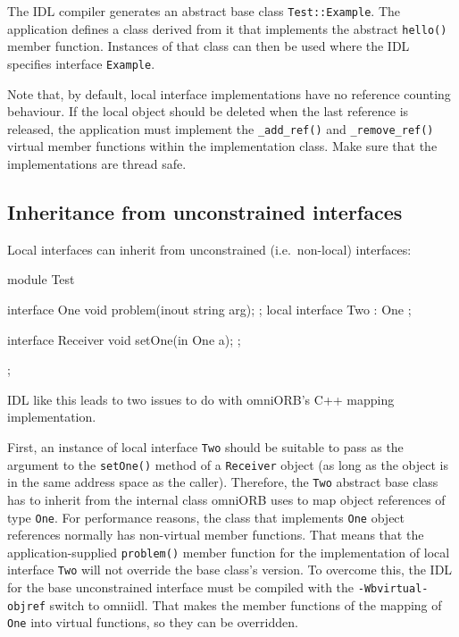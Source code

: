 \documentclass[11pt,oneside,a4paper]{book}
\newcommand{\type}[1]{\texttt{#1}}
\newcommand{\op}[1]{\texttt{#1()}}
\newcommand{\cmdline}[1]{\texttt{#1}}
\begin{document}
The IDL compiler generates an abstract base class
\type{Test::Example}. The application defines a class derived from it
that implements the abstract \op{hello} member function. Instances of
that class can then be used where the IDL specifies interface
\type{Example}.

Note that, by default, local interface implementations have no
reference counting behaviour. If the local object should be deleted
when the last reference is released, the application must implement
the \op{\_add\_ref} and \op{\_remove\_ref} virtual member functions
within the implementation class. Make sure that the implementations
are thread safe.


\subsection{Inheritance from unconstrained interfaces}

Local interfaces can inherit from unconstrained (i.e.\ non-local)
interfaces:

\begin{idllisting}
module Test {
  interface One {
    void problem(inout string arg);
  };
  local interface Two : One {
  };

  interface Receiver {
    void setOne(in One a);
  };
};
\end{idllisting}

IDL like this leads to two issues to do with omniORB's C++ mapping
implementation.

First, an instance of local interface \type{Two} should be suitable to
pass as the argument to the \op{setOne} method of a \type{Receiver}
object (as long as the object is in the same address space as the
caller). Therefore, the \type{Two} abstract base class has to inherit
from the internal class omniORB uses to map object references of type
\type{One}. For performance reasons, the class that implements
\type{One} object references normally has non-virtual member
functions. That means that the application-supplied \op{problem}
member function for the implementation of local interface \type{Two}
will not override the base class's version. To overcome this, the IDL
for the base unconstrained interface must be compiled with the
\cmdline{-Wbvirtual-objref} switch to omniidl. That makes the member
functions of the mapping of \type{One} into virtual functions, so they
can be overridden.
\end{document}
